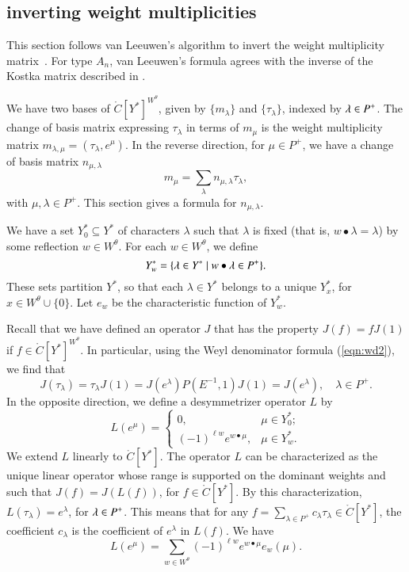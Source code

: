 \subsection{inverting weight multiplicities}

This section follows van Leeuwen's algorithm to invert the weight
multiplicity matrix~\cite{vanleeuwen}.  For type $A_n$, van Leeuwen's
formula agrees with the inverse of the Kostka matrix described in
\cite{duan}.

We have two bases of $\ring{C}[Y^*]^{W^\theta}$, given by
$\{m_\lambda\}$ and $\{\tau_\lambda\}$, indexed by $\lambda\in P^+$.
The change of basis matrix expressing $\tau_\lambda$ in terms of
$m_\mu$ is the weight multiplicity matrix $m_{\lambda,\mu} =
(\tau_\lambda,e^\mu)$.  In the reverse direction, for $\mu\in P^+$, we
have a change of basis matrix $n_{\mu,\lambda}$
\begin{equation}\label{eqn:n}
m_\mu = \sum_{\lambda} n_{\mu,\lambda} \tau_\lambda,
\end{equation}
with $\mu,\lambda\in P^+$.
This section gives a formula for $n_{\mu,\lambda}$.  

We have a set $Y^*_0\subseteq Y^*$ of characters $\lambda$ such that
$\lambda$ is fixed (that is, $w\bullet \lambda = \lambda$) by some
reflection $w\in W^\theta$.  For each $w\in W^\theta$, we define
\begin{equation}
Y^*_w = \{\lambda\in Y^*\mid w\bullet \lambda \in P^+\}.
\end{equation}
These sets partition $Y^*$, so that each $\lambda\in Y^*$ belongs to a
unique $Y^*_x$, for $x\in W^\theta\cup\{0\}$.  Let $e_w$ be the
characteristic function of $Y^*_w$.

Recall that we have defined an operator $J$ that has the property
$J(f) = f J(1)$ if $f\in \ring{C}[Y^*]^{W^\theta}$.  In particular,
using the Weyl denominator formula (\ref{eqn:wd2}), we find that
\begin{equation}
 J(\tau_\lambda) = \tau_\lambda J(1) 
= J(e^\lambda) P(E^{-1},1) J(1) = J(e^\lambda),\quad  \lambda\in P^+.
\end{equation}
In the opposite direction, we define a desymmetrizer operator $L$ by
\[
L(e^\mu) = \begin{cases}
0,& \mu\in Y^*_0;\\
(-1)^{\ell{w}} e^{w\bullet \mu},& \mu\in Y^*_w.
\end{cases}
\]
We extend $L$ linearly to $\ring{C}[Y^*]$.  The operator $L$ can be
characterized as the unique linear operator whose range is supported
on the dominant weights and such that $J(f) = J(L(f))$, for $f\in
\ring{C}[Y^*]$.  By this characterization, $L(\tau_\lambda) =
e^\lambda$, for $\lambda\in P^+$.  This means that for any $f =
\sum_{\lambda\in P^+} c_\lambda \tau_\lambda \in \ring{C}[Y^*]$, the
coefficient $c_\lambda$ is the coefficient of $e^\lambda$ in $L(f)$.
We have
\[
L(e^\mu) = \sum_{w\in W^\theta} (-1)^{\ell w} e^{w\bullet \mu} e_w(\mu).
\]

